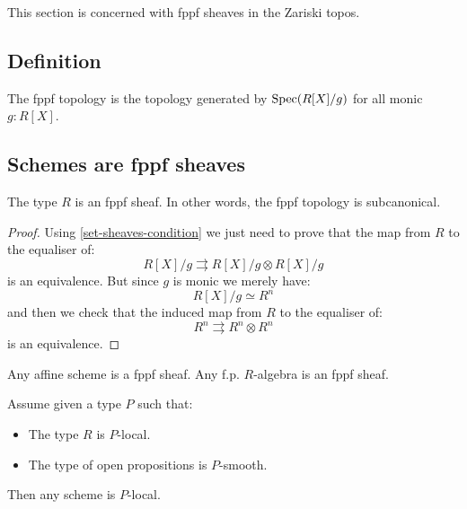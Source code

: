 This section is concerned with fppf sheaves in the Zariski topos.

\subsection{Definition}

\begin{definition}
The fppf topology is the topology generated by $\operatorname{Spec}(R[X]/g)$ for all monic $g:R[X]$.
\end{definition}

\subsection{Schemes are fppf sheaves}

\begin{lemma}\label{fppf-subcanonical}
The type $R$ is an fppf sheaf. In other words, the fppf topology is subcanonical.
\end{lemma}

\begin{proof}
Using \cref{set-sheaves-condition} we just need to prove that the map from $R$ to the equaliser of:
\[R[X]/g \rightrightarrows R[X]/g \otimes R[X]/g\]
is an equivalence. But since $g$ is monic we merely have:
\[R[X]/g \simeq R^n\]
and then we check that the induced map from $R$ to the equaliser of:
\[R^n \rightrightarrows R^n\otimes R^n\]
is an equivalence.
\end{proof}

\begin{corollary}
Any affine scheme is a fppf sheaf. Any f.p. $R$-algebra is an fppf sheaf.
\end{corollary}

\begin{lemma}\label{scheme-are-sheaf-from-affine}
Assume given a type $P$ such that:
\begin{itemize}
\item The type $R$ is $P$-local.
\item The type of open propositions is $P$-smooth.
\end{itemize}
Then any scheme is $P$-local.
\end{lemma}


